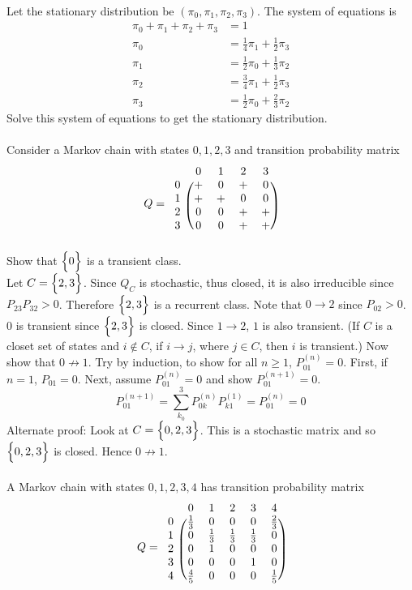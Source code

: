 \documentclass[12pt]{article}
\begin{document}
\\ Let the stationary distribution be $(\pi_0,\pi_1,\pi_2,\pi_3)$. The system of equations is $$ \begin{aligned} \pi_0 + \pi_1 + \pi_2 + \pi_3 &= 1 \\ \pi_0 &= \frac{1}{4}\pi_1 + \frac{1}{2}\pi_3 \\ \pi_1 &= \frac{1}{2}\pi_0 + \frac{1}{3}\pi_2 \\ \pi_2 &= \frac{3}{4}\pi_1 + \frac{1}{2}\pi_3 \\ \pi_3 &= \frac{1}{2}\pi_0 + \frac{2}{3}\pi_2 \end{aligned} $$ Solve this system of equations to get the stationary distribution. \\~\\
Consider a Markov chain with states $0,1,2,3$ and transition probability matrix $$ Q = \begin{blockarray}{ccccc}
&0&1&2&3 \\
\begin{block}{c(cccc)}
0 & + & 0 & + & 0 \\
1 & + & + & 0 & 0 \\ 
2 & 0 & 0 & + & + \\ 
3 & 0 & 0 & + & + \\   \end{block} \end{blockarray} $$
Show that $\Big\{ 0 \Big\}$ is a transient class. \\ 
Let $C = \Big\{ 2,3 \Big\}$. Since $Q_C$ is stochastic, thus closed, it is also irreducible since $P_{23}P_{32} > 0$. Therefore $\Big\{ 2,3 \Big\}$ is a recurrent class. Note that $0\to2$ since $P_{02} > 0$. $0$ is transient since $\Big\{ 2,3 \Big\}$ is closed. Since $1\to2$, $1$ is also transient. (If $C$ is a closet set of states and $i \not\in C$, if $i \to j$, where $j \in C$, then $i$ is transient.) Now show that $0 \not\to 1$. Try by induction, to show for all $n\geq1$, $P_{01}^{(n)} = 0$. First, if $n=1$, $P_{01} = 0$. Next, assume $P_{01}^{(n)} = 0$ and show $P_{01}^{(n+1)} = 0$. $$ P_{01}^{(n+1)} = \sum_{k_0}^3 P_{0k}^{(n)}P_{k1}^{(1)} = P_{01}^{(n)} = 0 $$ Alternate proof: Look at $C = \Big\{ 0,2,3 \Big\}$. This is a stochastic matrix and so $\Big\{ 0,2,3 \Big\}$ is closed. Hence $0 \not\to 1$. \\~\\
A Markov chain with states $0,1,2,3,4$ has transition probability matrix $$ Q = \begin{blockarray}{cccccc}
&0&1&2&3&4 \\
\begin{block}{c(ccccc)}
0 & \frac{1}{3} & 0 & 0 & 0 & \frac{2}{3}  \\
1 & 0 & \frac{1}{3} & \frac{1}{3} & \frac{1}{3} & 0 \\ 
2 & 0 & 1 & 0 & 0 & 0 \\ 
3 & 0 & 0 & 0 & 1 & 0 \\ 
4 & \frac{4}{5} & 0 & 0 & 0 & \frac{1}{5} \\ \end{block} \end{blockarray} $$
\end{document}
